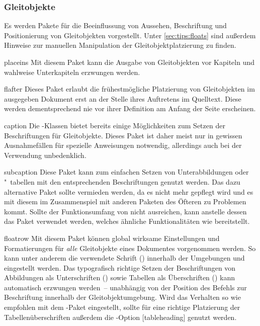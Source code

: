 \subsubsection{Gleitobjekte}
Es werden Pakete für die Beeinflussung von Aussehen, Beschriftung und 
Positionierung von Gleitobjekten vorgestellt. Unter \autoref{sec:tips:floats} 
sind außerdem Hinweise zur manuellen Manipulation der Gleitobjektplatzierung zu 
finden.

\begin{packages}
\item[placeins]
  Mit diesem Paket kann die Ausgabe von Gleitobjekten vor Kapiteln und wahlweise
  Unterkapiteln erzwungen werden.
\item[flafter]
  Dieses Paket erlaubt die frühestmögliche Platzierung von Gleitobjekten im 
  ausgegeben Dokument erst an der Stelle ihres Auftretens im Quelltext. Diese 
  werden dementsprechend nie vor ihrer Definition am Anfang der Seite 
  erscheinen.
\item[caption]
  Die \KOMAScript-Klassen bietet bereits einige Möglichkeiten zum Setzen der 
  Beschriftungen für Gleitobjekte. Dieses Paket ist daher meist nur in gewissen
  Ausnahmefällen für spezielle Anweisungen notwendig, allerdings auch bei der 
  Verwendung unbedenklich.
\item[subcaption]
  Diese Paket kann zum einfachen Setzen von Unterabbildungen oder "~tabellen 
  mit den entsprechenden Beschriftungen genutzt werden. Das dazu alternative 
  Paket  sollte vermieden werden, da es nicht mehr gepflegt 
  wird und es mit diesem im Zusammenspiel mit anderen Paketen des Öfteren zu 
  Problemen kommt. Sollte der Funktionsumfang von  nicht 
  ausreichen, kann anstelle dessen das Paket  verwendet 
  werden, welches ähnliche Funktionalitäten wie  bereitstellt.
\item[floatrow]
  Mit diesem Paket können global wirksame Einstellungen und Formatierungen für 
  \emph{alle} Gleitobjekte eines Dokumentes vorgenommen werden. So kann unter 
  anderem die verwendete Schrift () 
  innerhalb der Umgebungen  und  
  eingestellt werden. Das typografisch richtige Setzen der Beschriftungen von 
  Abbildungen als Unterschriften 
  ()
  sowie Tabellen als Überschriften 
  ()
  kann automatisch erzwungen werden~-- unabhängig von der Position des Befehls 
  zur Beschriftung  innerhalb der Gleitobjektumgebung. Wird das 
  Verhalten so wie empfohlen mit dem -Paket eingestellt, 
  sollte für eine richtige Platzierung der Tabellenüberschriften außerdem die 
  \KOMAScript-Option [tableheading] genutzt werden.
\end{packages}


